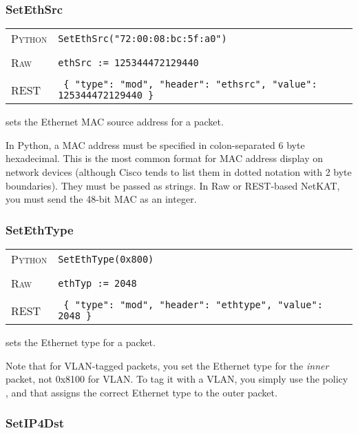 \subsubsection{SetEthSrc}

\bigskip
\begin{tabularx}{\linewidth}{lX}
\textsc{Python}   & \texttt{SetEthSrc("72:00:08:bc:5f:a0")} \\ \\
\textsc{Raw}    & \texttt{ethSrc := 125344472129440}     \\ \\
\textsc{REST} & \texttt{ \{ "type": "mod", "header": "ethsrc", "value": 125344472129440 \} }
\end{tabularx}

 sets the Ethernet MAC source address for a packet.    

In Python, a MAC address must be specified in colon-separated 6 byte hexadecimal.  This is the most common format
for MAC address display on network devices (although Cisco tends to list them in dotted notation with 2 byte
boundaries).  They must be passed as strings.  In Raw or REST-based NetKAT, you must send the 48-bit MAC as 
an integer.  

\subsubsection{SetEthType}

\bigskip
\begin{tabularx}{\linewidth}{lX}
\textsc{Python}   & \texttt{SetEthType(0x800)} \\ \\
\textsc{Raw}    & \texttt{ethTyp := 2048}     \\ \\
\textsc{REST} & \texttt{ \{ "type": "mod", "header": "ethtype", "value": 2048 \} }
\end{tabularx}

 sets the Ethernet type for a packet.    

Note that for VLAN-tagged packets, you set the Ethernet type for the \emph{inner} packet, not 0x8100
for VLAN.  To tag it with a VLAN, you simply use the policy , and that assigns the
correct Ethernet type to the outer packet.  

\subsubsection{SetIP4Dst}

